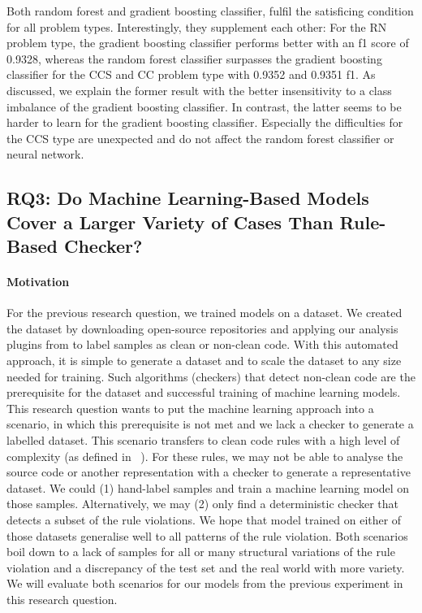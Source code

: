 Both random forest and gradient boosting classifier, fulfil the satisficing condition for all problem types. Interestingly, they supplement each other: For the RN problem type, the gradient boosting classifier performs better with an f1 score of 0.9328, whereas the random forest classifier surpasses the gradient boosting classifier for the CCS and CC problem type with 0.9352 and 0.9351 f1. As discussed, we explain the former result with the better insensitivity to a class imbalance of the gradient boosting classifier. In contrast, the latter seems to be harder to learn for the gradient boosting classifier. Especially the difficulties for the CCS type are unexpected and do not affect the random forest classifier or neural network.

\subsection{RQ3: Do Machine Learning-Based Models Cover a Larger Variety of Cases Than Rule-Based Checker? }\label{rq:3}

\paragraph{Motivation}
For the previous research question, we trained models on a dataset. We created the dataset by downloading open-source repositories and applying our analysis plugins from  to label samples as clean or non-clean code. With this automated approach, it is simple to generate a dataset and to scale the dataset to any size needed for training. Such algorithms (checkers) that detect non-clean code are the prerequisite for the dataset and successful training of machine learning models. This research question wants to put the machine learning approach into a scenario, in which this prerequisite is not met and we lack a checker to generate a labelled dataset. 
This scenario transfers to clean code rules with a high level of complexity (as defined in ~). For these rules, we may not be able to analyse the source code or another representation with a checker to generate a representative dataset. We could (1) hand-label samples and train a machine learning model on those samples. Alternatively, we may (2) only find a deterministic checker that detects a subset of the rule violations. We hope that model trained on either of those datasets generalise well to all patterns of the rule violation. Both scenarios boil down to a lack of samples for all or many structural variations of the rule violation and a discrepancy of the test set and the real world with more variety. We will evaluate both scenarios for our models from the previous experiment in this research question.


